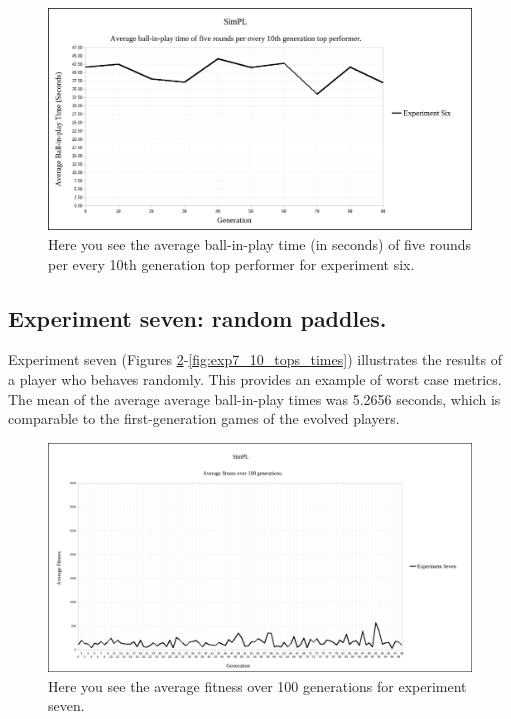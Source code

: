 \documentclass[a4paper,10pt]{article}
\begin{document}
\begin{figure}[H]  
  \centering
  \includegraphics[width=1\textwidth]{figures/exp6_10_tops_times.png}
  \caption{Here you see the average ball-in-play time (in seconds) of five rounds per every 10th generation top performer for experiment six.}
  \label{fig:exp6_10_tops_times}
\end{figure}

\subsection{Experiment seven: random paddles.}

Experiment seven (Figures \ref{fig:exp7_avg_fit}-\ref{fig:exp7_10_tops_times}) illustrates the results of a player who behaves randomly. This provides an example of worst case metrics. The mean of the average average ball-in-play times was 5.2656 seconds, which is comparable to the first-generation games of the evolved players.

\begin{figure}[H]  
  \centering
  \includegraphics[width=1\textwidth]{figures/exp7_avg_fit.png}
  \caption{Here you see the average fitness over 100 generations for experiment seven.}
  \label{fig:exp7_avg_fit}
\end{figure}
\end{document}
